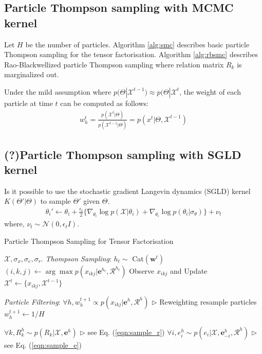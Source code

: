 \documentclass{article}
\begin{document}
\subsection{Particle Thompson sampling with MCMC kernel}
Let $H$ be the number of particles.
Algorithm \ref{alg:smc} describes basic particle Thompson sampling for the tensor factorisation.
Algorithm \ref{alg:rbsmc} describes Rao-Blackwellized particle Thompson sampling where relation matrix $R_k$ is marginalized out.

Under the mild assumption where $p(\Theta | \mathcal{X}^{t-1}) \approx p(\Theta | \mathcal{X}^{t}$, the weight of each particle at time $t$ can be computed as follows:
\begin{align}
w_{h}^{t} = \frac{p(\mathcal{X}^{t} | \Theta)}{p(\mathcal{X}^{t-1} | \Theta)} = p(x^{t} | \Theta, \mathcal{X}^{t-1})
\end{align}

\subsection{(?)Particle Thompson sampling with SGLD kernel}
Is it possible to use the stochastic gradient Langevin dynamics (SGLD) \cite{welling2011bayesian} kernel $K(\Theta' | \Theta)$ to sample $\Theta'$ given $\Theta$.
\begin{align}
\theta_i' \leftarrow \theta_i + \frac{\epsilon_t}{2}\Bigg\{\nabla_{\theta_i} \log p(\mathcal{X}|\theta_i) + \nabla_{\theta_i} \log p(\theta_i | \sigma_\theta)\Bigg\} + \nu_t
\end{align}
where, $\nu_t \sim \mathcal{N}(0, \epsilon_t I)$.

\begin{algorithm}[t!]
   \caption{Particle Thompson Sampling for Tensor Factorisation}
   \label{alg:smc}
\begin{algorithmic}
    $\mathcal{X}, \sigma_x, \sigma_e, \sigma_r$.
   \STATE \textit{Thompson Sampling}:
   \STATE $h_t \sim $ Cat$(\mathbf{w}^{t})$
   \STATE $(i,k,j) \leftarrow \arg\max p(x_{ikj}| \mathbf{e}^{h_t}, \mathcal{R}^{h_t})$
   \STATE Observe $x_{ikj}$ and Update $\mathcal{X}^{t} \leftarrow  \{x_{ikj}, \mathcal{X}^{t-1}\}$
   
   \STATE \textit{Particle Filtering}:   
   \STATE $\forall h, w_h^{t+1} \propto p(x_{ikj} | \mathbf{e}^{h}, \mathcal{R}^{h})$   \hfill $\triangleright$ Reweighting
   \STATE resample particles
   \STATE $w_h^{t+1} \leftarrow 1/H$
   \ENDIF

   \STATE $\forall k, R_k^{h} \sim p(R_k | \mathcal{X}, \mathbf{e}^{h})$   \hfill $\triangleright$ see Eq. (\ref{eqn:sample_r})
   \STATE $\forall i, e^{h}_i \sim p(e_i | \mathcal{X}, \mathbf{e}^{h}_{-i}, \mathcal{R}^{h})$ \hfill $\triangleright$ see Eq. (\ref{eqn:sample_e})
   \ENDFOR
   
   \ENDFOR
\end{algorithmic}
\end{algorithm}
\end{document}

